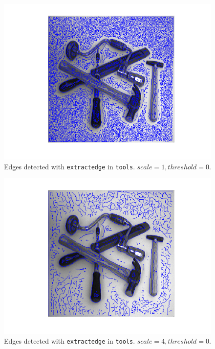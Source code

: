 \begin{figure}[H]
	\centering
	\includegraphics[scale=0.8]{./images/Q7/tools/1_0.png}
	\caption{Edges detected with \texttt{extractedge} in \texttt{tools}. $scale = 1, threshold = 0$.}
	\label{fig:Q7_tools_1_0}
\end{figure}

\begin{figure}[H]
	\centering
	\includegraphics[scale=0.8]{./images/Q7/tools/4_0.png}
	\caption{Edges detected with \texttt{extractedge} in \texttt{tools}. $scale = 4, threshold = 0$.}
	\label{fig:Q7_tools_4_0}
\end{figure}

